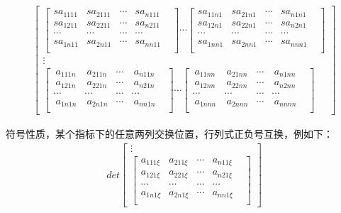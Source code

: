 \documentclass[twoside,a4paper,CCT]{cctart}   %
\begin{document}
\begin{list}{}
\begin{align*}
\begin{bmatrix}
  \begin{bmatrix}
 sa_{1111}& sa_{2111}&\cdots&sa_{n111}\\
 sa_{1211}& sa_{2211}&\cdots&sa_{n211}\\
  \cdots&\cdots&\cdots &\cdots& \\
sa_{1n11}& sa_{2n11}&\cdots&sa_{nn11}\\
 \end{bmatrix}
\cdots
\begin{bmatrix}
sa_{11n1}& sa_{21n1}&\cdots&sa_{n1n1}\\
sa_{12n1}& sa_{22n1}&\cdots&sa_{n2n1}\\
  \cdots&\cdots&\cdots &\cdots& \\
sa_{1nn1}& sa_{2nn1}&\cdots&sa_{nnn1}\\
\end{bmatrix}\\
\vdots\\
\begin{bmatrix}
\  a_{111n}& \  a_{211n}&\cdots&\  a_{n11n}\\
\  a_{121n}& \  a_{221n}&\cdots&\  a_{n21n}\\
  \cdots&\cdots&\cdots &\cdots& \\
\  a_{1n1n}& \  a_{2n1n}&\cdots&\  a_{nn1n}\\
\end{bmatrix}
\cdots
\begin{bmatrix}
\  a_{11nn}& \  a_{21nn}&\cdots& \  a_{n1nn}\\
\  a_{12nn}& \  a_{22nn}&\cdots&\  a_{n2nn}\\
  \cdots&\cdots&\cdots &\cdots& \\
\  a_{1nnn}& \  a_{2nnn}&\cdots& \  a_{nnnn}\\
\end{bmatrix}
\end{bmatrix}
 \end{align*}
 \item
 符号性质，某个指标下的任意两列交换位置，行列式正负号互换，例如下：
\begin{align*}
det
  \begin{bmatrix}
\vdots\\
 \begin{bmatrix}
 a_{111\xi}& a_{211\xi}&\cdots&a_{n11\xi}\\
 a_{121\xi}& a_{221\xi}&\cdots&a_{n21\xi}\\
  \cdots&\cdots&\cdots &\cdots& \\
a_{1n1\xi}& a_{2n1\xi}&\cdots&a_{nn1\xi}\\

\end{bmatrix}
\end{bmatrix}
\end{align*}
\end{list}
\end{document}
